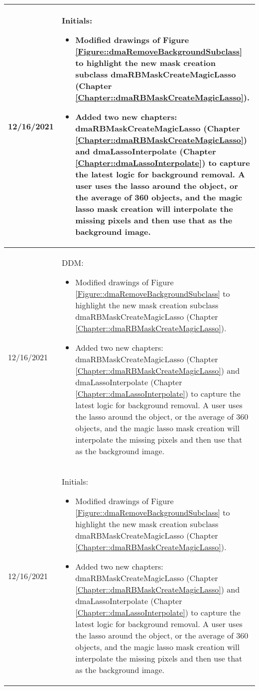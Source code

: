 \begin{longtable}{|l||p{13.5cm}|}
12/16/2021 & Initials:
\begin{itemize}[topsep=0pt,itemsep=0pt,parsep=0pt,partopsep=0pt,leftmargin=12pt]
\item Modified drawings of Figure \ref{Figure::dmaRemoveBackgroundSubclass} to
highlight the new mask creation subclass dmaRBMaskCreateMagicLasso (Chapter 
\ref{Chapter::dmaRBMaskCreateMagicLasso}).
\item Added two new chapters: dmaRBMaskCreateMagicLasso
(Chapter \ref{Chapter::dmaRBMaskCreateMagicLasso}) and dmaLassoInterpolate
(Chapter \ref{Chapter::dmaLassoInterpolate}) to capture the latest logic for 
background removal.  A user uses the lasso around the object, or the average 
of 360 objects, and the magic lasso mask creation will interpolate the missing
pixels and then use that as the background image. 
\end{itemize} 
\\ \hline

12/16/2021 & DDM:
\begin{itemize}[topsep=0pt,itemsep=0pt,parsep=0pt,partopsep=0pt,leftmargin=12pt]
\item Modified drawings of Figure \ref{Figure::dmaRemoveBackgroundSubclass} to
highlight the new mask creation subclass dmaRBMaskCreateMagicLasso (Chapter 
\ref{Chapter::dmaRBMaskCreateMagicLasso}).
\item Added two new chapters: dmaRBMaskCreateMagicLasso
(Chapter \ref{Chapter::dmaRBMaskCreateMagicLasso}) and dmaLassoInterpolate
(Chapter \ref{Chapter::dmaLassoInterpolate}) to capture the latest logic for 
background removal.  A user uses the lasso around the object, or the average 
of 360 objects, and the magic lasso mask creation will interpolate the missing
pixels and then use that as the background image. 
\end{itemize} 
\\ \hline

12/16/2021 & Initials:
\begin{itemize}[topsep=0pt,itemsep=0pt,parsep=0pt,partopsep=0pt,leftmargin=12pt]
\item Modified drawings of Figure \ref{Figure::dmaRemoveBackgroundSubclass} to
highlight the new mask creation subclass dmaRBMaskCreateMagicLasso (Chapter 
\ref{Chapter::dmaRBMaskCreateMagicLasso}).
\item Added two new chapters: dmaRBMaskCreateMagicLasso
(Chapter \ref{Chapter::dmaRBMaskCreateMagicLasso}) and dmaLassoInterpolate
(Chapter \ref{Chapter::dmaLassoInterpolate}) to capture the latest logic for 
background removal.  A user uses the lasso around the object, or the average 
of 360 objects, and the magic lasso mask creation will interpolate the missing
pixels and then use that as the background image. 
\end{itemize} 
\\ \hline


\end{longtable}


